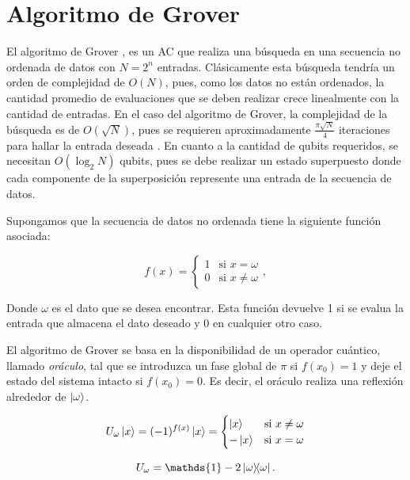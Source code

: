 \chapter{Algoritmo de Grover}

El algoritmo de Grover \cite{Grover_1996}, es un AC que realiza una búsqueda en una secuencia no ordenada de datos con $N=2^n$ entradas. Clásicamente esta búsqueda tendría un orden de complejidad de $O(N)$, pues, como los datos no están ordenados, la cantidad promedio de evaluaciones que se deben realizar crece linealmente con la cantidad de entradas. En el caso del algoritmo de Grover, la complejidad de la búsqueda es de $O(\sqrt{N})$, pues se requieren aproximadamente $\frac{\pi\sqrt{N}}{4}$ iteraciones para hallar la entrada deseada \cite{Grover_1996}. En cuanto a la cantidad de qubits requeridos, se necesitan $O(\log_2 N)$ qubits, pues se debe realizar un estado superpuesto donde cada componente de la superposición represente una entrada de la secuencia de datos.

Supongamos que la secuencia de datos no ordenada tiene la siguiente función asociada:

\begin{equation}
    f(x) =
    \begin{cases}
        1 & \text{si } x = \omega \\
        0 & \text{si } x \neq \omega
    \end{cases} ,
\end{equation}

Donde $\omega$ es el dato que se desea encontrar. Esta función devuelve 1 si se evalua la entrada que almacena el dato deseado y 0 en cualquier otro caso.

El algoritmo de Grover se basa en la disponibilidad de un operador cuántico, llamado \textit{oráculo}, tal que se introduzca un fase global de $\pi$ si $f(x_0)=1$ y deje el estado del sistema intacto si $f(x_0)=0$. Es decir, el oráculo realiza una reflexión alrededor de $\ket{\omega}$.

\begin{equation}
    U_\omega \ket{x} = (-1)^{f(x)} \ket{x} =
    \begin{cases}
        \ket{x} & \text{si } x \neq \omega \\
        - \ket{x} & \text{si } x = \omega
    \end{cases}
\end{equation}

\begin{equation}
U_\omega = \mathds{1} - 2 \ketbra{\omega}{\omega} .
\end{equation}

